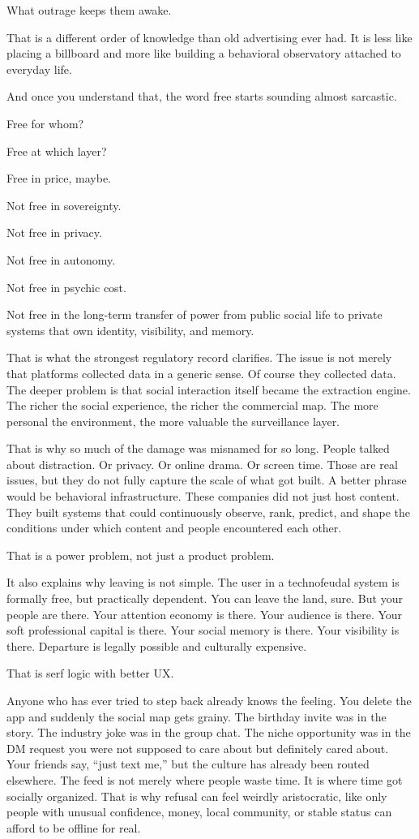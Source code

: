 \documentclass[
  american,
  12pt,
  letterpaper,
]{article}
\begin{document}
What outrage keeps them awake.

That is a different order of knowledge than old advertising ever had. It
is less like placing a billboard and more like building a behavioral
observatory attached to everyday life.

And once you understand that, the word free starts sounding almost
sarcastic.

Free for whom?

Free at which layer?

Free in price, maybe.

Not free in sovereignty.

Not free in privacy.

Not free in autonomy.

Not free in psychic cost.

Not free in the long-term transfer of power from public social life to
private systems that own identity, visibility, and memory.

That is what the strongest regulatory record clarifies. The issue is not
merely that platforms collected data in a generic sense. Of course they
collected data. The deeper problem is that social interaction itself
became the extraction engine. The richer the social experience, the
richer the commercial map. The more personal the environment, the more
valuable the surveillance layer.

That is why so much of the damage was misnamed for so long. People
talked about distraction. Or privacy. Or online drama. Or screen time.
Those are real issues, but they do not fully capture the scale of what
got built. A better phrase would be behavioral infrastructure. These
companies did not just host content. They built systems that could
continuously observe, rank, predict, and shape the conditions under
which content and people encountered each other.

That is a power problem, not just a product problem.

It also explains why leaving is not simple. The user in a technofeudal
system is formally free, but practically dependent. You can leave the
land, sure. But your people are there. Your attention economy is there.
Your audience is there. Your soft professional capital is there. Your
social memory is there. Your visibility is there. Departure is legally
possible and culturally expensive.

That is serf logic with better UX.

Anyone who has ever tried to step back already knows the feeling. You
delete the app and suddenly the social map gets grainy. The birthday
invite was in the story. The industry joke was in the group chat. The
niche opportunity was in the DM request you were not supposed to care
about but definitely cared about. Your friends say, ``just text me,''
but the culture has already been routed elsewhere. The feed is not
merely where people waste time. It is where time got socially organized.
That is why refusal can feel weirdly aristocratic, like only people with
unusual confidence, money, local community, or stable status can afford
to be offline for real.
\end{document}
